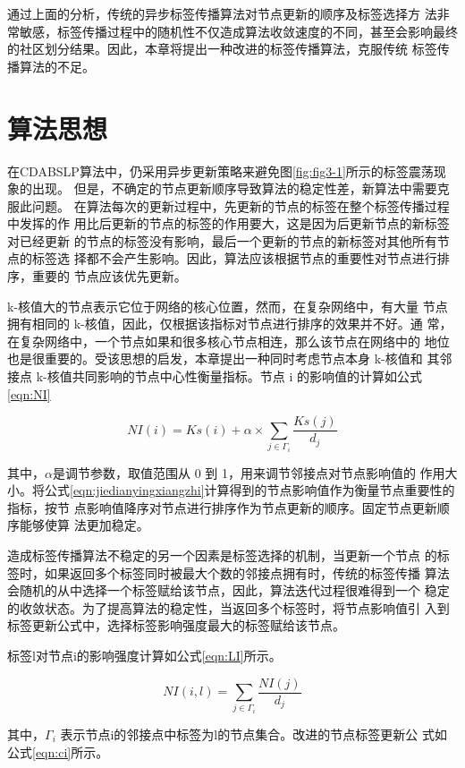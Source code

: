 通过上面的分析，传统的异步标签传播算法对节点更新的顺序及标签选择方
法非常敏感，标签传播过程中的随机性不仅造成算法收敛速度的不同，甚至会影响最终的社区划分结果。因此，本章将提出一种改进的标签传播算法，克服传统
标签传播算法的不足。

\section{算法思想}
在CDABSLP算法中，仍采用异步更新策略来避免图\ref{fig:fig3-1}所示的标签震荡现象的出现。
但是，不确定的节点更新顺序导致算法的稳定性差，新算法中需要克服此问题。
在算法每次的更新过程中，先更新的节点的标签在整个标签传播过程中发挥的作
用比后更新的节点的标签的作用要大，这是因为后更新节点的新标签对已经更新
的节点的标签没有影响，最后一个更新的节点的新标签对其他所有节点的标签选
择都不会产生影响。因此，算法应该根据节点的重要性对节点进行排序，重要的
节点应该优先更新。 

k-核值大的节点表示它位于网络的核心位置，然而，在复杂网络中，有大量
节点拥有相同的 k-核值，因此，仅根据该指标对节点进行排序的效果并不好。通
常，在复杂网络中，一个节点如果和很多核心节点相连，那么该节点在网络中的
地位也是很重要的。受该思想的启发，本章提出一种同时考虑节点本身 k-核值和
其邻接点 k-核值共同影响的节点中心性衡量指标。节点 i 的影响值的计算如公式\ref{eqn:NI}

\begin{equation}
  \label{eqn:NI}
  NI(i)=Ks(i)+\alpha \times \sum_{j \in \Gamma _i} \frac{Ks(j)}{d_j}
\end{equation}

其中，$\alpha$是调节参数，取值范围从 0 到 1，用来调节邻接点对节点影响值的
作用大小。将公式\ref{eqn:jiedianyingxiangzhi}计算得到的节点影响值作为衡量节点重要性的指标，按节
点影响值降序对节点进行排序作为节点更新的顺序。固定节点更新顺序能够使算
法更加稳定。 

造成标签传播算法不稳定的另一个因素是标签选择的机制，当更新一个节点
的标签时，如果返回多个标签同时被最大个数的邻接点拥有时，传统的标签传播
算法会随机的从中选择一个标签赋给该节点，因此，算法迭代过程很难得到一个
稳定的收敛状态。为了提高算法的稳定性，当返回多个标签时，将节点影响值引
入到标签更新公式中，选择标签影响强度最大的标签赋给该节点。 

标签l对节点i的影响强度计算如公式\ref{eqn:LI}所示。

\begin{equation}
  \label{eqn:LI}
  NI(i,l)=\sum_{j \in \Gamma _i} \frac{NI(j)}{d_j}
\end{equation}

其中，$\Gamma _i$
表示节点i的邻接点中标签为l的节点集合。改进的节点标签更新公
式如公式\ref{eqn:ci}所示。

